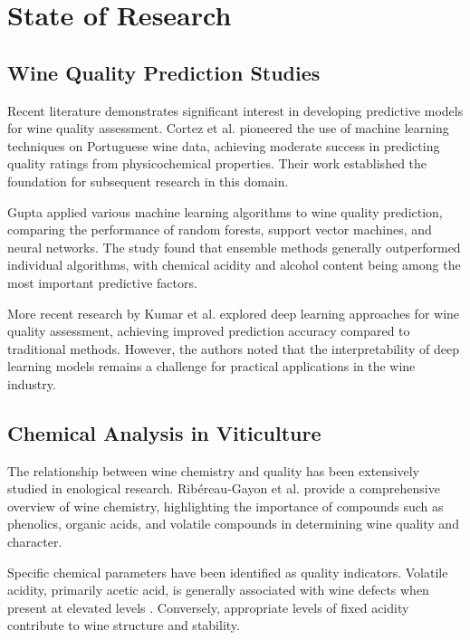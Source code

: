 \chapter{State of Research}

\section{Wine Quality Prediction Studies}

Recent literature demonstrates significant interest in developing predictive models for wine quality assessment. Cortez et al. \cite{cortez2009} pioneered the use of machine learning techniques on Portuguese wine data, achieving moderate success in predicting quality ratings from physicochemical properties. Their work established the foundation for subsequent research in this domain.

Gupta \cite{gupta2018} applied various machine learning algorithms to wine quality prediction, comparing the performance of random forests, support vector machines, and neural networks. The study found that ensemble methods generally outperformed individual algorithms, with chemical acidity and alcohol content being among the most important predictive factors.

More recent research by Kumar et al. \cite{kumar2020} explored deep learning approaches for wine quality assessment, achieving improved prediction accuracy compared to traditional methods. However, the authors noted that the interpretability of deep learning models remains a challenge for practical applications in the wine industry.

\section{Chemical Analysis in Viticulture}

The relationship between wine chemistry and quality has been extensively studied in enological research. Ribéreau-Gayon et al. \cite{ribereau2017} provide a comprehensive overview of wine chemistry, highlighting the importance of compounds such as phenolics, organic acids, and volatile compounds in determining wine quality and character.

Specific chemical parameters have been identified as quality indicators. Volatile acidity, primarily acetic acid, is generally associated with wine defects when present at elevated levels \cite{jackson2020}. Conversely, appropriate levels of fixed acidity contribute to wine structure and stability.


